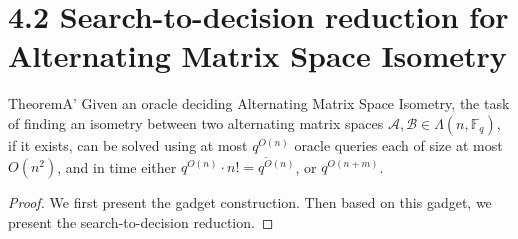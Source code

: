 \section*{4.2 Search-to-decision reduction for Alternating Matrix Space Isometry}
\begin{authorclaim}{TheoremA'}
Given an oracle deciding Alternating Matrix Space Isometry, the task of finding an isometry between two alternating matrix spaces $\mathcal A,\mathcal B\in\Lambda(n,\mathbb F_q)$, if it exists, can be solved using at most $q^{O(n)}$ oracle queries each of size at most $O(n^2)$, and in time either $q^{O(n)}\cdot n!=q^{\widetilde O(n)}$, or $q^{O(n+m)}$.
\end{authorclaim}
\begin{proof}
We first present the gadget construction. Then based on this gadget, we present the search-to-decision reduction.

\end{proof}
